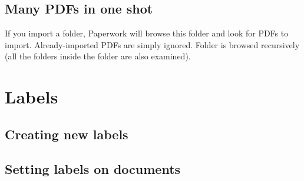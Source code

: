 \documentclass[10pt,a4paper]{article}
\begin{document}
\subsection{Many PDFs in one shot}

If you import a folder, Paperwork will browse this folder and look
for PDFs to import. Already-imported PDFs are simply ignored. Folder
is browsed recursively (all the folders inside the folder are also
examined).

\section{Labels}

\subsection{Creating new labels}



\subsection{Setting labels on documents}

\end{document}
